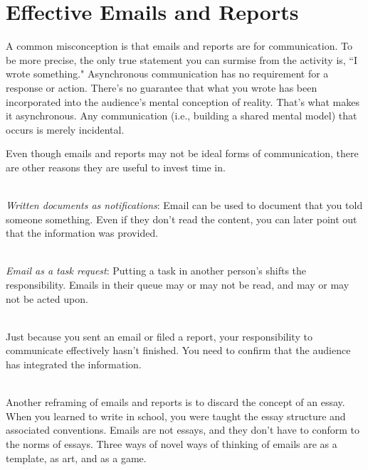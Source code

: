 \section{Effective Emails and Reports}


A common misconception is that emails and reports are for communication. To be more precise, the only true statement you can surmise from the activity is, ``I wrote something." 
Asynchronous communication has no requirement for a response or action. There's no guarantee that what you wrote has been incorporated into the audience's mental conception of reality. That's what makes it asynchronous. Any communication (i.e., building a shared mental model) that occurs is merely incidental.

Even though emails and reports may not be ideal forms of communication, there are other reasons they are useful to invest time in.

\ \\
\textit{Written documents as notifications}: Email can be used to document that you told someone something. Even if they don't read the content, you can later point out that the information was provided.

\ \\
\textit{Email as a task request}: Putting a task in another person's shifts the responsibility. Emails in their queue may or may not be read, and may or may not be acted upon. 

\ \\
Just because you sent an email or filed a report, your responsibility to communicate effectively hasn't finished. You need to confirm that the audience has integrated the information. 

\ \\


Another reframing of emails and reports is to discard the concept of an essay. When you learned to write in school, you were taught the essay structure and associated conventions. Emails are not essays, and they don't have to conform to the norms of essays. Three ways of novel ways of thinking of emails are as a template, as art, and as a game.

